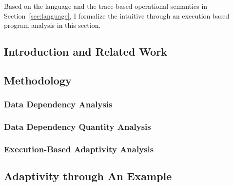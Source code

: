 
Based on the language and the trace-based operational semantics in Section~\ref{sec:language},
I formalize the intuitive through an execution based program analysis in this section.

\subsection{Introduction and Related Work}
\label{subsec:dynamic-intro}


\subsection{Methodology}
\label{subsec:dynamic-methodology}

\subsubsection{Data Dependency Analysis}
\label{subsubsec:dynamic-datadep}

\subsubsection{Data Dependency Quantity Analysis}
\label{subsubsec:dynamic-reachability}
%
\subsubsection{Execution-Based Adaptivity Analysis}
\label{subsubsec:dynamic-adapt}
%
%
\subsection{Adaptivity through An Example}
\label{subsec:dynamic-examples}

%

% 
%
%
